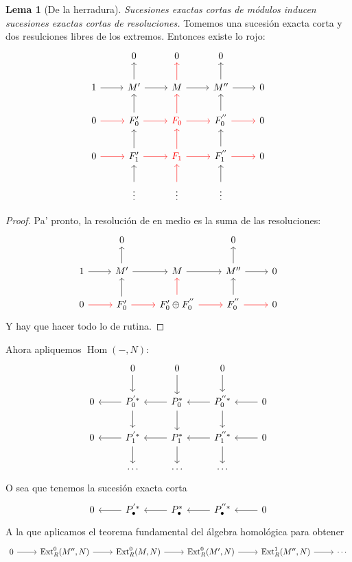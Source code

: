 \documentclass[spanish]{book}
\theoremstyle{definition}
\newtheorem*{lema}{Lema}
\DeclareMathOperator{\Hom}{Hom}
\DeclareMathOperator{\Ext}{Ext}
\begin{document}
\begin{lema}[De la herradura] \textit{Sucesiones exactas cortas de módulos inducen sucesiones exactas cortas de resoluciones.} Tomemos una sucesión exacta corta y dos resulciones libres de los extremos. Entonces existe lo rojo:
	\[\begin{tikzcd}
		&0&0&0\\
		1\arrow[r]&M'\arrow[u]\arrow[r]&M\arrow[red,u]\arrow[r]&M''\arrow[u]\arrow[r]&0\\
		0\arrow[red,r]&F_0'\arrow[r,red]\arrow[u]&\textcolor{red}{F_0}\arrow[r,red]\arrow[u,red]&F_0^{''}\arrow[u]\arrow[r,red]&0\\
		0\arrow[red,r]&F_1'\arrow[r,red]\arrow[u]&\textcolor{red}{F_1}\arrow[r,red]\arrow[u,red]&F_1^{''}\arrow[u]\arrow[r,red]&0\\
		&\vdots\arrow[u]&\vdots\arrow[u,red]&\vdots\arrow[u]&
	\end{tikzcd}\]
\end{lema}
\begin{proof} Pa' pronto, la resolución de en medio es la suma de las resoluciones:
	\[\begin{tikzcd}
		&0&&0\\
		1\arrow[r]&M'\arrow[r]\arrow[u]&M\arrow[r]&M''\arrow[r]\arrow[u]&0\\
		0\arrow[red,r]&F_0'\arrow[r,red]\arrow[u]&F_0'\oplus F_0^{''}\arrow[r,red]\arrow[u,red]&F_0^{''}\arrow[u]\arrow[r,red]&0
	\end{tikzcd}\]
	Y hay que hacer todo lo de rutina.
\end{proof}
Ahora apliquemos $\Hom(-,N)$:
\[\begin{tikzcd}
	&0\arrow[d]&0\arrow[d]&0\arrow[d]&\\
	0&P_0^{'*}\arrow[l]\arrow[d]&P_0^{*}\arrow[l]\arrow[d]&P_0^{''*}\arrow[l]\arrow[d]&0\arrow[l]\\	0&P_1^{'*}\arrow[l]\arrow[d]&P_1^{*}\arrow[l]\arrow[d]&P_1^{''*}\arrow[l]\arrow[d]&0\arrow[l]\\
	&\cdots&\cdots&\cdots&
\end{tikzcd}\]
O sea que tenemos la sucesión exacta corta
\[\begin{tikzcd}
	0&P^{'*}_\bullet\arrow[l]&P^*_\bullet\arrow[l]&P_\bullet^{''*}\arrow[l]&0\arrow[l]
\end{tikzcd}\]
A la que aplicamos el teorema fundamental del álgebra homológica para obtener
\[\begin{tikzcd}
	0\arrow[r]&\Ext_R^0(M'',N)\arrow[r]&\Ext_R^0(M,N)\arrow[r]&\Ext_R^0(M',N)\arrow[r]&\Ext_R^1(M'',N)\arrow[r]&\cdots
\end{tikzcd}\]
\end{document}

